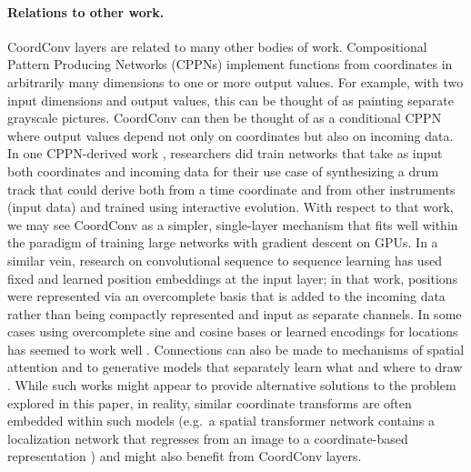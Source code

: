 \documentclass{article}
\begin{document}
\paragraph{Relations to other work.} \vspace*{-0.6em}
CoordConv layers are related to many other bodies of work.
Compositional Pattern Producing Networks (CPPNs)
\cite{stanley-2007-GPEM-compositional-pattern-producing}
implement functions from coordinates in arbitrarily many dimensions to one or more output values. For example, with two input dimensions and  output values, this can be thought of as painting  separate grayscale pictures.
CoordConv can then be thought of as a conditional CPPN where output values depend not only on coordinates but also on incoming data.
In one CPPN-derived work \cite{hoover-2009-ConnSci-exploiting-functional-relationships}, researchers did train networks that take as input both coordinates and incoming data for their use case of synthesizing a drum track that could derive both from a time coordinate and from other instruments (input data) and trained using interactive evolution. With respect to that work, we may see CoordConv as a simpler, single-layer mechanism that fits well within the paradigm of training large networks with gradient descent on GPUs.
In a similar vein, research on convolutional sequence to sequence learning \cite{gehring-2017-arXiv-convolutional-sequence-to-sequence} has used fixed and learned position embeddings at the input layer; in that work, positions were represented via an overcomplete basis that is added to the incoming data rather than being compactly represented and input as separate channels. In some cases using overcomplete sine and cosine bases or learned encodings for locations has seemed to work well \cite{vaswani-2017-NIPS-attention-is-all-you-need, parmar2018image}.
Connections can also be made to mechanisms of spatial attention \cite{jaderberg:spatial} and to generative models that separately learn what and where to draw \cite{gregor-2015-draw:-a-recurrent-neural, whatwhere_gan}. While such works might appear to provide alternative solutions to the problem explored in this paper, in reality, similar coordinate transforms are often embedded within such models (e.g.\ a spatial transformer network contains a localization network that regresses from an image to a coordinate-based representation \cite{jaderberg:spatial}) and might also benefit from CoordConv layers. 
\end{document}
